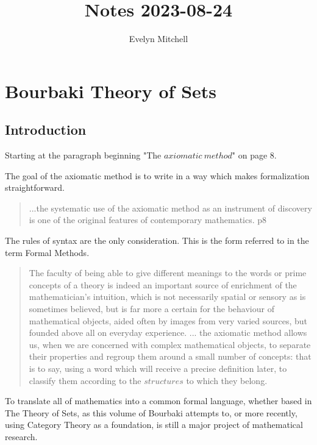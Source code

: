 \documentclass[]{scrartcl}
\title{Notes 2023-08-24}
\author{Evelyn Mitchell}
\begin{document}
\maketitle

\begin{abstract}

\end{abstract}

\section{Bourbaki Theory of Sets}

\subsection{Introduction}

Starting at the paragraph beginning "The $axiomatic\ method$" on page 8.

The goal of the axiomatic method is to write in a way which makes formalization straightforward. 

\begin{quote}
	...{the systematic use of the axiomatic method} as an instrument of discovery is one of the original features of contemporary mathematics. p8
\end{quote}

The rules of syntax are the only consideration. This is the form referred to in the term Formal Methods.

\begin{quote}
	The faculty of being able to give different meanings to the words or prime concepts of a theory is indeed an important source of enrichment of the mathematician's intuition, which is not necessarily spatial or sensory as is sometimes believed, but is far more a certain for the behaviour of mathematical objects, aided often by images from very varied sources, but founded above all on everyday experience. ...
	the axiomatic method allows us, when we are concerned with complex mathematical objects, to separate their properties and regroup them around a small number of concepts: that is to say, using a word which will receive a precise definition later, to classify them according to the $structures$ to which they belong.
\end{quote}

To translate all of mathematics into a common formal language, whether based in The Theory of Sets, as this volume of Bourbaki attempts to, or more recently, using Category Theory as a foundation, is still a major project of mathematical research.
\end{document}
